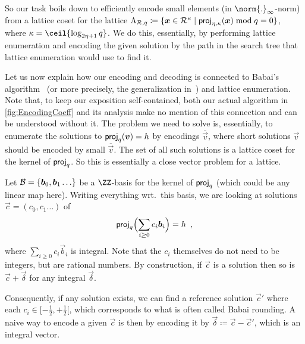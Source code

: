 So our task boils down to efficiently encode small elements (in $\norm{.}_{\infty}$-norm) from a lattice coset for the lattice $\Lambda_{\mathcal{R},q} \coloneqq \{\boldsymbol{x}\in\mathcal{R}^\kappa \mid \mathsf{proj}_{\eta,\kappa}(\boldsymbol{x})\bmod q = 0\}$, where $\limbs = \ceil{\log_{2\eta+1}q}$.
We do this, essentially, by performing lattice enumeration and encoding the given solution by the path in the search tree that lattice enumeration would use to find it.


\begin{remark}\label{rmk:RelationshipToBabai}
Let us now explain how our encoding and decoding is connected to Babai's algorithm~\cite{DBLP:journals/combinatorica/Babai86} (or more precisely, the generalization in~\cite{RSA:LinPei11}) and lattice enumeration.
Note that, to keep our exposition self-contained, both our actual algorithm in \autoref{fig:EncodingCoeff} and its analysis make no mention of this connection and can be understood without it.
The problem we need to solve is, essentially, to enumerate the solutions to $\mathsf{proj}_q(\boldsymbol{v}) = h$ by encodings $\overline{\vec{v}}$, where short solutions $\vec{v}$ should be encoded by small $\overline{\vec{v}}$.
The set of all such solutions is a lattice coset for the kernel of $\mathsf{proj}_q$. So this is essentially a close vector problem for a lattice.

Let $\mathcal{B} = \{\boldsymbol{b}_0,\boldsymbol{b}_1\ldots\}$ be a $\ZZ$-basis for the kernel of $\mathsf{proj}_q$ (which could be any linear map here).
Writing everything wrt.\ this basis, we are looking at solutions $\vec{c} = (c_0,c_1\ldots)$ of
\[
\mathsf{proj}_q\Bigl(\sum_{i\geq 0} c_i\boldsymbol{b}_i\Bigr) = h\enspace,
\]
where $\sum_{i\geq 0} c_i\vec{b}_i$ is integral.
Note that the $c_i$ themselves do not need to be integers, but are rational numbers.
By construction, if $\vec{c}$ is a solution then so is $\vec{c} + \vec{\delta}$ for any integral $\vec{\delta}$.

Consequently, if any solution exists, we can find a reference solution $\vec{c}'$ where each $c_i\in [-\tfrac12,+\tfrac12[$, which corresponds to what is often called Babai rounding.
A naive way to encode a given $\vec{c}$ is then by encoding it by $\vec{\delta} \coloneqq \vec{c} - \vec{c}'$, which is an integral vector.


\end{remark}
